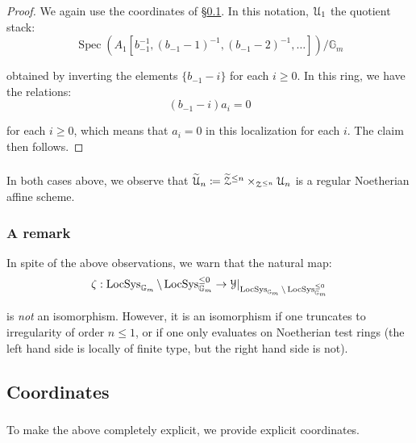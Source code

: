 \documentclass[reqno,11pt]{amsart}
\numberwithin{equation}{subsection}
\theoremstyle{remark}
\newcommand{\bG}{{\mathbb G}}
\newcommand{\sU}{{\EuScript U}}
\newcommand{\sY}{{\EuScript Y}}
\newcommand{\sZ}{{\EuScript Z}}
\newcommand{\on}{\operatorname}
\newcommand{\Spec}{\on{Spec}}
\newcommand{\LocSys}{\on{LocSys}}
\begin{document}
\begin{proof}

We again use the coordinates of \S \ref{ss:coords}.
In this notation, $\sU_1$ the quotient stack:
%
\[
\Spec(A_1[b_{-1}^{-1},(b_{-1}-1)^{-1},(b_{-1}-2)^{-1},\ldots])/\bG_m
\]

\noindent obtained by inverting the elements $\{b_{-1}-i\}$ for each $i \geq 0$.
In this ring, we have the relations:
%
\[
(b_{-1}-i)a_i = 0
\]

\noindent for each $i \geq 0$, which means that $a_i = 0$ in this localization
for each $i$. The claim then follows. 

\end{proof}

\subsubsection{}\label{sss:u-reg-noeth}

In both cases above, we observe that $\widetilde{\sU}_n \coloneqq 
\widetilde{\sZ}^{\leq n} \times_{\sZ^{\leq n}} \sU_n$ is a regular Noetherian 
affine scheme. 

\subsubsection{A remark}

In spite of the above observations, we warn that the natural map:
%
\[
\zeta: \LocSys_{\bG_m} \setminus \LocSys_{\bG_m}^{\leq 0} \to 
\sY|_{\LocSys_{\bG_m} \setminus \LocSys_{\bG_m}^{\leq 0}}
\]

\noindent is \emph{not} an isomorphism. However, it is an isomorphism 
if one truncates to irregularity of order $n \leq 1$, 
or if one only evaluates on Noetherian 
test rings (the left hand side is locally of finite type, 
but the right hand side is not). 

\subsection{Coordinates}\label{ss:coords}

\subsubsection{}

To make the above completely explicit, we provide explicit 
coordinates.

\subsubsection{} 
\end{document}
